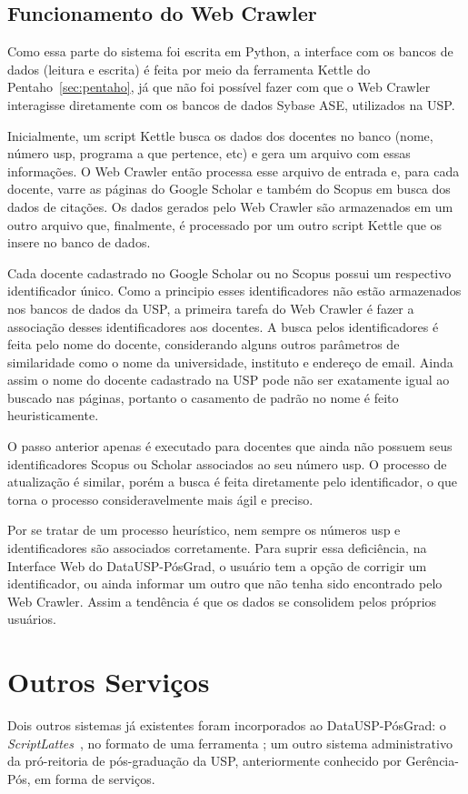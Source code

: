 \subsection{Funcionamento do Web Crawler}

Como essa parte do sistema foi escrita em Python, a interface com os bancos de dados (leitura e escrita) é feita
por meio da ferramenta Kettle do Pentaho~\ref{sec:pentaho}, já que não foi possível fazer com que o Web Crawler interagisse
diretamente com os bancos de dados Sybase ASE, utilizados na USP.
\par
Inicialmente, um script Kettle busca os dados dos docentes no banco (nome, número usp, programa a que pertence, etc) e gera um arquivo com essas informações. O Web Crawler então processa esse arquivo de entrada e, para cada docente, varre as páginas do Google Scholar e também do Scopus em busca dos dados de citações. Os dados gerados pelo Web Crawler são armazenados em um outro arquivo que, finalmente, é processado por um outro script Kettle que os insere no banco de dados.
\par
Cada docente cadastrado no Google Scholar ou no Scopus possui um respectivo identificador único. Como a principio esses identificadores não estão armazenados nos bancos de dados da USP, a primeira tarefa do Web Crawler é fazer a associação desses identificadores aos docentes. A busca pelos identificadores é feita pelo nome do docente, considerando alguns outros parâmetros de similaridade como o nome da universidade, instituto e endereço de email. Ainda assim o nome do docente cadastrado na USP pode não ser exatamente igual ao buscado nas páginas, portanto o casamento de padrão no nome é feito heuristicamente.
\par
O passo anterior apenas é executado para docentes que ainda não possuem seus identificadores Scopus ou Scholar associados ao seu número usp. O processo de atualização é similar, porém a busca é feita diretamente pelo identificador, o que torna o processo consideravelmente mais ágil e preciso.
\par
Por se tratar de um processo heurístico, nem sempre os números usp e identificadores são associados corretamente. Para suprir essa deficiência, na Interface Web do DataUSP-PósGrad, o usuário tem a opção de corrigir um identificador, ou ainda informar um outro que não tenha sido encontrado pelo Web Crawler. Assim a tendência é que os dados se consolidem pelos próprios usuários.

\newpage

\section{Outros Serviços}
Dois outros sistemas já existentes foram incorporados ao DataUSP-PósGrad: o \emph{ScriptLattes}~\cite{sclt}, no formato de uma ferramenta ; um outro sistema administrativo da pró-reitoria de pós-graduação da USP, anteriormente conhecido por Gerência-Pós, em forma de serviços.

